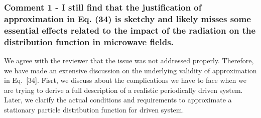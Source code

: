\documentclass{article}
\begin{document}
\subsubsection*{Comment 1 -
\color{RoyalBlue} I still find that the justification of approximation in Eq. (34) is sketchy and likely misses some essential effects related to the impact of the radiation on the distribution function in microwave fields.}

We agree with the reviewer that the issue was not addressed properly. Therefore, we have made an extensive discussion on the underlying validity of approximation in Eq.~[34]. Fisrt, we discuss about the complications we have to face when we are trying to derive a full description of a realistic periodically driven system. Later, we clarify the actual conditions and requirements to approximate a stationary particle distribution function for driven system.
\end{document}
